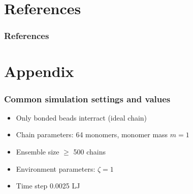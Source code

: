 \documentclass[handout]{beamer}
\begin{document}
\section{References}

\begin{frame}
    \frametitle{References}
    
    
\end{frame}

\section{Appendix}

\begin{frame}
    \frametitle{Common simulation settings and values}

    \begin{itemize}
        \item Only bonded beads interract (ideal chain)
        \item Chain parameters: 64 monomers, monomer mass $m=1$
        \item Ensemble size $ \ge $ 500 chains
        \item Environment parameters: $\zeta=1$
        \item Time step 0.0025 LJ
    \end{itemize}

\end{frame}
\end{document}
